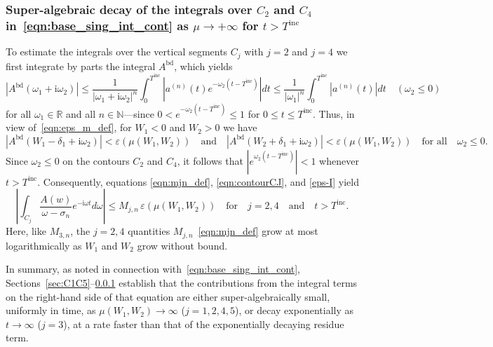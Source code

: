\documentclass[11pt]{article}
\theoremstyle{plain}
\theoremstyle{remark}
\begin{document}
\subsubsection{Super-algebraic decay of the integrals over $C_2$ and $C_4$ in~\eqref{eqn:base_sing_int_cont} as $\mu \to +\infty$ for $t > T^\mathrm{inc}$}\label{sec:C2C4}

To estimate the integrals over the vertical segments $C_j$ with $j=2$
and $j=4$ we first integrate by parts the integral $A^\mathrm{bd}$,
which yields
\begin{equation}\label{eqn:compAdecay}
    |A^{\mathrm{bd}}(\omega_1 + \mathrm{i}\omega_2)| \le \frac{1}{|\omega_1 + \mathrm{i}\omega_2|^n} \int_0^{T^\mathrm{inc}} |a^{(n)}(t)e^{-\omega_2(t - T^\mathrm{inc})}|dt \le  \frac{1}{|\omega_1|^n}\int_0^{T^\mathrm{inc}} |a^{(n)}(t)|dt \quad  (\omega_2 \le 0)
\end{equation}
for all $\omega_1\in\mathbb{R}$ and all $n\in\mathbb{N}$---since
$0 < e^{-\omega_2(t - T^\mathrm{inc})}\leq 1$ for
$0\leq t\leq T^\mathrm{inc}$. Thus, in view of~\eqref{eqn:eps_m_def},
for $W_1<0$ and $W_2>0$ we have
\begin{equation}\label{eps-I}
  |A^{\mathrm{bd}}(W_1 - \delta_1 + \mathrm{i}\omega_2)| < \varepsilon(\mu(W_1,W_2)) \quad \text{and} \quad |A^{\mathrm{bd}}(W_2 + \delta_1 + \mathrm{i}\omega_2)| < \varepsilon(\mu(W_1,W_2)) \quad \text{for all} \quad {\omega_2 \le 0}.
\end{equation}
Since $\omega_2 \le 0$ on the contours $C_2$ and $C_4$, it follows that $|e^{\omega_2(t - T^\mathrm{inc})}| < 1$ whenever $t > T^\mathrm{inc}$. Consequently, equations \eqref{eqn:mjn_def}, \eqref{eqn:contourCJ}, and \eqref{eps-I} yield
\begin{equation}\label{eqn:vert_bound}
    \left | \int_{C_j}\frac{A(w)}{\omega - \sigma_n}e^{-\mathrm{i}\omega t}d\omega\right| \le M_{j,n}\, \varepsilon(\mu(W_1,W_2))  \quad \text{for} \quad j = 2,4 \quad\mbox{and}\quad  t > T^{\mathrm{inc}}.
\end{equation}
Here, like $M_{3,n}$, the $j=2,4$ quantities
$M_{j,n}$~\eqref{eqn:mjn_def} grow at most logarithmically as $W_1$
and $W_2$ grow without bound.

In summary, as noted in connection
with~\eqref{eqn:base_sing_int_cont},
Sections~\ref{sec:C1C5}--\ref{sec:C2C4} establish that the
contributions from the integral terms on the right-hand side of that
equation are either super-algebraically small, uniformly in time, as
$\mu(W_1,W_2) \to \infty$ ($j=1,2,4,5$), or decay exponentially as
$t \to \infty$ ($j=3$), at a rate faster than that of the
exponentially decaying residue term.
\end{document}
